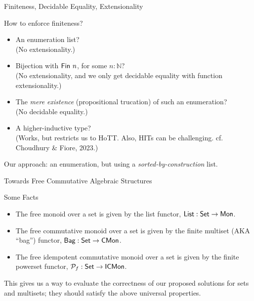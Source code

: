 \documentclass{beamer}
\begin{document}
\begin{frame}{Finiteness, Decidable Equality, Extensionality}
\begin{block}{How to enforce finiteness?}
\begin{itemize}
  \item An enumeration list? \\
        (No extensionality.)
        \pause
  \item Bijection with $\AgdaDatatype{Fin}~n$, for some $n : \mathbb{N}$? \\
        (No extensionality, and we only get decidable equality with function extensionality.)
        \pause
  \item The \emph{mere existence} (propositional trucation) of such an enumeration? \\
        (No decidable equality.)
        \pause
  \item A higher-inductive type? \\
        (Works, but restricts us to HoTT. Also, HITs can be challenging. cf. Choudhury \& Fiore, 2023.)
\end{itemize}
\pause
\end{block}

\begin{center}
Our approach: an enumeration, but using a \emph{sorted-by-construction} list.
\end{center}
\end{frame}


\begin{frame}{Towards Free Commutative Algebraic Structures}
\begin{block}{Some Facts}
\begin{itemize}
  \item The free monoid over a set is given by the list functor, $\AgdaDatatype{List} : \AgdaDatatype{Set} \to \AgdaDatatype{Mon}$.
        \pause
  \item The free commutative monoid over a set is given by the finite multiset (AKA ``bag'')
        functor, $\AgdaDatatype{Bag} : \AgdaDatatype{Set} \to \AgdaDatatype{CMon}$.
        \pause
  \item The free idempotent commutative monoid over a set is given by the finite powerset
        functor, $\AgdaDatatype{\ensuremath{\mathcal{P}_{f}}} : \AgdaDatatype{Set} \to \AgdaDatatype{ICMon}$.
\end{itemize}
\end{block}
\pause

\begin{center}
This gives us a way to evaluate the correctness of our proposed solutions for sets and multisets; they should satisfy the above universal properties.
\end{center}
\end{frame}
\end{document}

